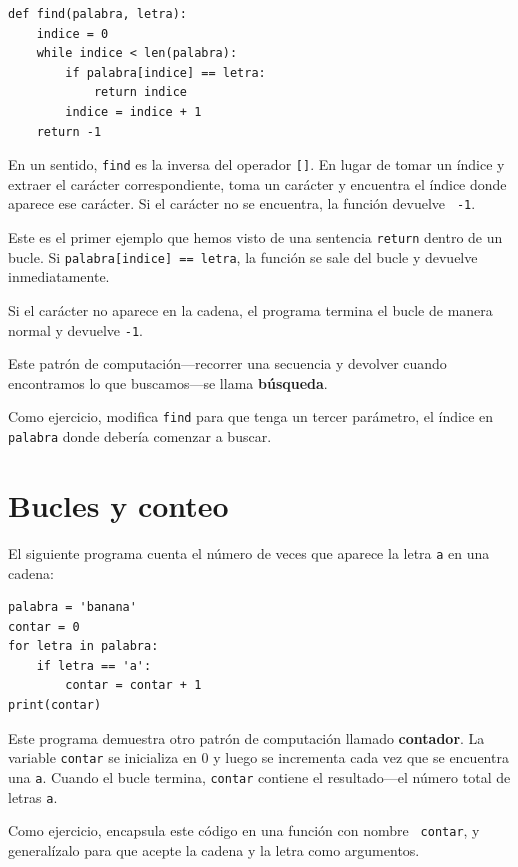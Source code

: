 \documentclass[10pt]{book}
\begin{document}
\begin{verbatim}
def find(palabra, letra):
    indice = 0
    while indice < len(palabra):
        if palabra[indice] == letra:
            return indice
        indice = indice + 1
    return -1
\end{verbatim}
%
En un sentido, {\tt find} es la inversa del operador {\tt []}.
En lugar de tomar un índice y extraer el carácter correspondiente,
toma un carácter y encuentra el índice donde aparece ese
carácter.  Si el carácter no se encuentra, la función devuelve {\tt
-1}.

Este es el primer ejemplo que hemos visto de una sentencia {\tt return}
dentro de un bucle.  Si {\tt palabra[indice] == letra}, la función se sale
del bucle y devuelve inmediatamente.

Si el carácter no aparece en la cadena, el programa
termina el bucle de manera normal y devuelve {\tt -1}.

Este patrón de computación---recorrer una secuencia y devolver
cuando encontramos lo que buscamos---se llama {\bf búsqueda}.

Como ejercicio, modifica {\tt find} para que tenga un
tercer parámetro, el índice en {\tt palabra} donde debería comenzar a
buscar.


\section{Bucles y conteo}
\label{counter}

El siguiente programa cuenta el número de veces que aparece la letra {\tt a}
en una cadena:

\begin{verbatim}
palabra = 'banana'
contar = 0
for letra in palabra:
    if letra == 'a':
        contar = contar + 1
print(contar)
\end{verbatim}
%
Este programa demuestra otro patrón de computación llamado {\bf
contador}.  La variable {\tt contar} se inicializa en 0 y luego
se incrementa cada vez que se encuentra una {\tt a}.
Cuando el bucle termina, {\tt contar}
contiene el resultado---el número total de letras {\tt a}.

Como ejercicio, encapsula este código en una función con nombre {\tt
contar}, y generalízalo para que acepte la cadena y la
letra como argumentos.
\end{document}
